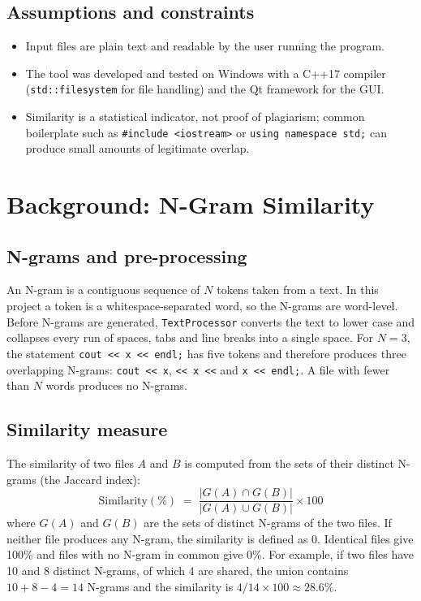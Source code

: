 \documentclass[11pt,a4paper]{report}
\newcommand{\cc}[1]{\texttt{#1}}
\begin{document}
\subsection{Assumptions and constraints}
\begin{itemize}[nosep]
  \item Input files are plain text and readable by the user running the program.
  \item The tool was developed and tested on Windows with a C++17 compiler
        (\cc{std::filesystem} for file handling) and the Qt framework for the GUI.
  \item Similarity is a statistical indicator, not proof of plagiarism; common boilerplate
        such as \cc{\#include <iostream>} or \cc{using namespace std;} can produce small
        amounts of legitimate overlap.
\end{itemize}

\section{Background: N-Gram Similarity}

\subsection{N-grams and pre-processing}
An N-gram is a contiguous sequence of $N$ tokens taken from a text. In this project a token
is a whitespace-separated word, so the N-grams are word-level. Before N-grams are
generated, \cc{TextProcessor} converts the text to lower case and collapses every run of
spaces, tabs and line breaks into a single space. For $N=3$, the statement
\cc{cout << x << endl;} has five tokens and therefore produces three overlapping N-grams:
\cc{cout << x}, \cc{<< x <<} and \cc{x << endl;}. A file with fewer than $N$ words produces
no N-grams.

\subsection{Similarity measure}
The similarity of two files $A$ and $B$ is computed from the sets of their distinct
N-grams (the Jaccard index):
\begin{equation}
  \mathrm{Similarity}(\%) \;=\; \frac{|G(A)\cap G(B)|}{|G(A)\cup G(B)|}\times 100
\end{equation}
where $G(A)$ and $G(B)$ are the sets of distinct N-grams of the two files. If neither file
produces any N-gram, the similarity is defined as 0. Identical files give 100\% and files
with no N-gram in common give 0\%. For example, if two files have 10 and 8 distinct
N-grams, of which 4 are shared, the union contains $10+8-4=14$ N-grams and the similarity
is $4/14\times100\approx 28.6\%$.
\end{document}
